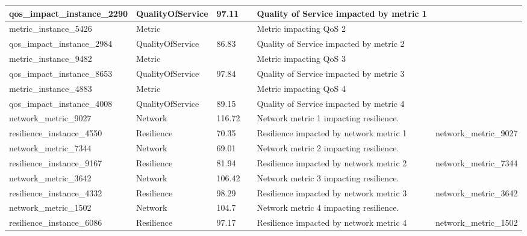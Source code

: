 \begin{longtable}{|l|p{2cm}|l|l|p{3cm}|p{3cm}|}
qos\_impact\_instance\_2290 & QualityOfService & 97.11 &  & Quality of Service impacted by metric 1 &  \\ \hline
metric\_instance\_5426 & Metric &  &  & Metric impacting QoS 2 &  \\ \hline
qos\_impact\_instance\_2984 & QualityOfService & 86.83 &  & Quality of Service impacted by metric 2 &  \\ \hline
metric\_instance\_9482 & Metric &  &  & Metric impacting QoS 3 &  \\ \hline
qos\_impact\_instance\_8653 & QualityOfService & 97.84 &  & Quality of Service impacted by metric 3 &  \\ \hline
metric\_instance\_4883 & Metric &  &  & Metric impacting QoS 4 &  \\ \hline
qos\_impact\_instance\_4008 & QualityOfService & 89.15 &  & Quality of Service impacted by metric 4 &  \\ \hline
network\_metric\_9027 & Network & 116.72 &  & Network metric 1 impacting resilience. &  \\ \hline
resilience\_instance\_4550 & Resilience & 70.35 &  & Resilience impacted by network metric 1 & network\_metric\_9027 \\ \hline
network\_metric\_7344 & Network & 69.01 &  & Network metric 2 impacting resilience. &  \\ \hline
resilience\_instance\_9167 & Resilience & 81.94 &  & Resilience impacted by network metric 2 & network\_metric\_7344 \\ \hline
network\_metric\_3642 & Network & 106.42 &  & Network metric 3 impacting resilience. &  \\ \hline
resilience\_instance\_4332 & Resilience & 98.29 &  & Resilience impacted by network metric 3 & network\_metric\_3642 \\ \hline
network\_metric\_1502 & Network & 104.7 &  & Network metric 4 impacting resilience. &  \\ \hline
resilience\_instance\_6086 & Resilience & 97.17 &  & Resilience impacted by network metric 4 & network\_metric\_1502 \\ \hline\end{longtable}